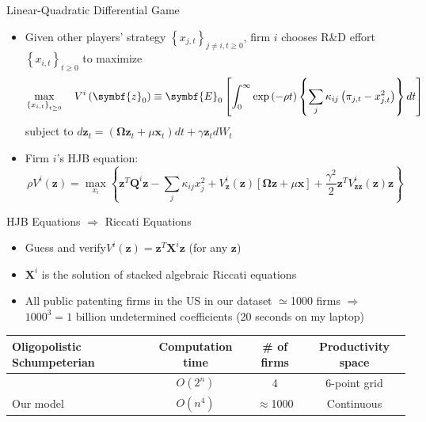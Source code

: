 \documentclass[
  aspectratio=169,  %
]{beamer}
\theoremstyle{plain}
\begin{document}
\begin{frame}{Linear-Quadratic Differential Game}

  \vspace{-1mm}

  \begin{itemize}
    \item Given other players' strategy $\left\{ x_{j,t}\right\} _{j\neq i,t\geq0}$,
          firm $i$ chooses R\&D effort $\left\{ x_{i,t}\right\} _{t\geq0}$
          to maximize
          \[
            \max_{\left\{ x_{i,t}\right\} _{t\geq0}}\quad V^{i}\left(\text{\ensuremath{\symbf{z}}}_{0}\right)\equiv\symbf{E}_{0}\left[\int_{0}^{\infty}\exp\left(-\rho t\right)\left\{ \sum_{j}\kappa_{ij}\left(\pi_{j,t}-x_{j,t}^{2}\right)\right\} dt\right]
          \]
          subject to $d\symbf{z}_{t}=\left(\symbf{\Omega}\symbf{z}_{t}+\mu\symbf{x}_{t}\right)dt+\gamma\symbf{z}_{t}dW_{t}$\medskip{}
    \item Firm $i$'s HJB equation:
          \[
            \rho V^{i}\left(\symbf{z}\right)=\max_{x_{i}}\left\{ \symbf{z}^{T}\symbf{Q}^{i}\symbf{z}-\sum_{j}\kappa_{ij}x_{j}^{2}+V_{\symbf{z}}^{i}\left(\symbf{z}\right)\left[\symbf{\Omega}\symbf{z}+\mu\symbf{x}\right]+\frac{\gamma^{2}}{2}\symbf{z}^{T}V_{\symbf{zz}}^{i}\left(\symbf{z}\right)\symbf{z}\right\}
          \]
  \end{itemize}
\end{frame}
%
\begin{frame}{HJB Equations $\Longrightarrow$ Riccati Equations}

  \label{hjb}
  \begin{itemize}
    \item Guess and verify$V^{i}\left(\symbf{z}\right)=\symbf{z}^{T}\symbf{X}^{i}\symbf{z}$
          (for any $\symbf{z}$)
    \item $\symbf{X}^{i}$ is the solution of stacked algebraic Riccati equations \hyperlink{riccati}{}
    \item All public patenting firms in the US in our dataset $\simeq$1000
          firms $\Longrightarrow$ \\
          $1000^{3}=1$ billion undetermined coefficients (20 seconds on my laptop)\medskip{}
  \end{itemize}
  \begin{center}
    \begin{tabular}{@{}p{5cm}ccc@{}}
      \toprule
      Oligopolistic Schumpeterian                                       & Computation time & \# of firms    & Productivity space \\
      \midrule
      \citet{Cavenaile2023-lo}                    & $O(2^n)$         & 4              & 6-point grid       \\
      Our model                                   & $O(n^4)$         & $\approx$1000  & Continuous         \\
      \bottomrule
    \end{tabular}
  \end{center}

\end{frame}
\end{document}
